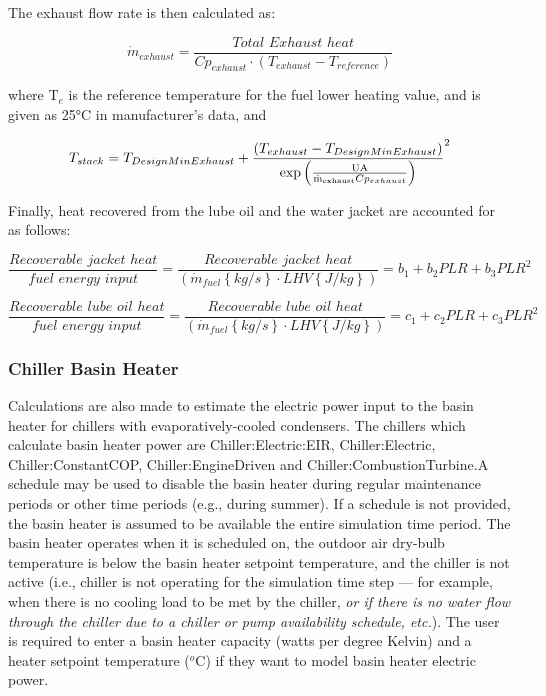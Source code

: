 The exhaust flow rate is then calculated as:

\begin{equation}
{\dot m_{exhaust}} = \frac{{Total\,\,Exhaust\,\,heat}}{{C{p_{exhaust}} \cdot \left( {{T_{exhaust}} - {T_{reference}}} \right)}}
\end{equation}

where T\(_{e}\) is the reference temperature for the fuel lower heating value, and is given as 25°C in manufacturer's data, and

\begin{equation}
{T_{stack}} = {T_{DesignMinExhaust}} + {\frac{{\left( {{T_{exhaust}} - {T_{DesignMinExhaust}}} \right)}}{{{\rm{exp}}\left( {\frac{{{\rm{UA}}}}{{{{{\rm{\dot m}}}_{{\rm{exhaust}}}}C{p_{exhaust}}}}} \right)}}^2}
\end{equation}

Finally, heat recovered from the lube oil and the water jacket are accounted for as follows:

\begin{equation}
\frac{{Recoverable\,\,jacket\,\,heat}}{{fuel\,\,energy\,\,input}} = \frac{{Recoverable\,\,jacket\,\,heat}}{{\left( {{{\dot m}_{fuel}}\left\{ {kg/s} \right\} \cdot LHV\left\{ {J/kg} \right\}} \right)}} = {b_1} + {b_2}PLR + {b_3}PL{R^2}
\end{equation}

\begin{equation}
\frac{{Recoverable\,\,lube\,\,oil\,\,heat}}{{fuel\,\,energy\,\,input}} = \frac{{Recoverable\,\,lube\,\,oil\,\,heat}}{{\left( {{{\dot m}_{fuel}}\left\{ {kg/s} \right\} \cdot LHV\left\{ {J/kg} \right\}} \right)}} = {c_1} + {c_2}PLR + {c_3}PL{R^2}
\end{equation}

\subsubsection{Chiller Basin Heater}\label{chiller-basin-heater-3}

Calculations are also made to estimate the electric power input to the basin heater for chillers with evaporatively-cooled condensers. The chillers which calculate basin heater power are Chiller:Electric:EIR, Chiller:Electric, Chiller:ConstantCOP, Chiller:EngineDriven and Chiller:CombustionTurbine.A schedule may be used to disable the basin heater during regular maintenance periods or other time periods (e.g., during summer). If a schedule is not provided, the basin heater is assumed to be available the entire simulation time period. The basin heater operates when it is scheduled on, the outdoor air dry-bulb temperature is below the basin heater setpoint temperature, and the chiller is not active (i.e., chiller is not operating for the simulation time step --- for example, when there is no cooling load to be met by the chiller, \emph{or if there is no water flow through the chiller due to a chiller or pump availability schedule, etc.}). The user is required to enter a basin heater capacity (watts per degree Kelvin) and a heater setpoint temperature (\(^{o}\)C) if they want to model basin heater electric power.

